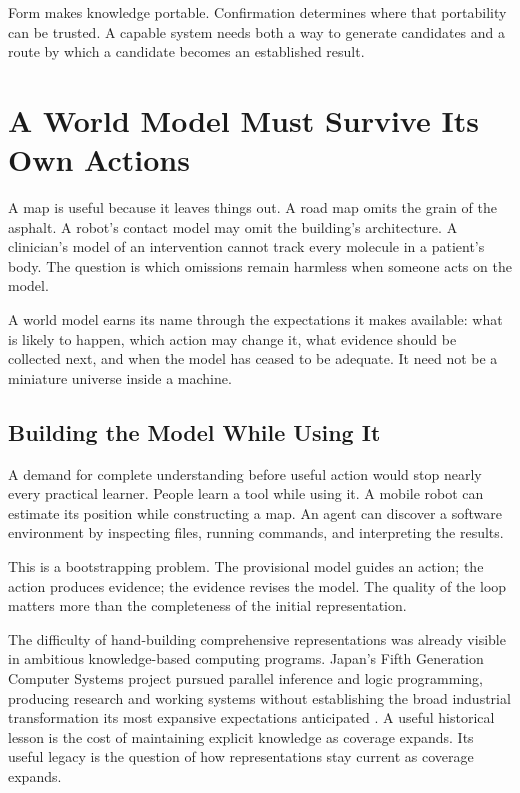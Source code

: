 \documentclass[11pt,openany]{book}
\begin{document}
Form makes knowledge portable. Confirmation determines where that portability can be trusted. A capable system needs both a way to generate candidates and a route by which a candidate becomes an established result.

\section{A World Model Must Survive Its Own Actions}

A map is useful because it leaves things out. A road map omits the grain of the asphalt. A robot's contact model may omit the building's architecture. A clinician's model of an intervention cannot track every molecule in a patient's body. The question is which omissions remain harmless when someone acts on the model.

A world model earns its name through the expectations it makes available: what is likely to happen, which action may change it, what evidence should be collected next, and when the model has ceased to be adequate. It need not be a miniature universe inside a machine.

\subsection{Building the Model While Using It}

A demand for complete understanding before useful action would stop nearly every practical learner. People learn a tool while using it. A mobile robot can estimate its position while constructing a map. An agent can discover a software environment by inspecting files, running commands, and interpreting the results.

This is a bootstrapping problem. The provisional model guides an action; the action produces evidence; the evidence revises the model. The quality of the loop matters more than the completeness of the initial representation.

The difficulty of hand-building comprehensive representations was already visible in ambitious knowledge-based computing programs. Japan's Fifth Generation Computer Systems project pursued parallel inference and logic programming, producing research and working systems without establishing the broad industrial transformation its most expansive expectations anticipated \cite{aiso1988fifth,feigenbaum1993japanese}. A useful historical lesson is the cost of maintaining explicit knowledge as coverage expands. Its useful legacy is the question of how representations stay current as coverage expands.
\end{document}
